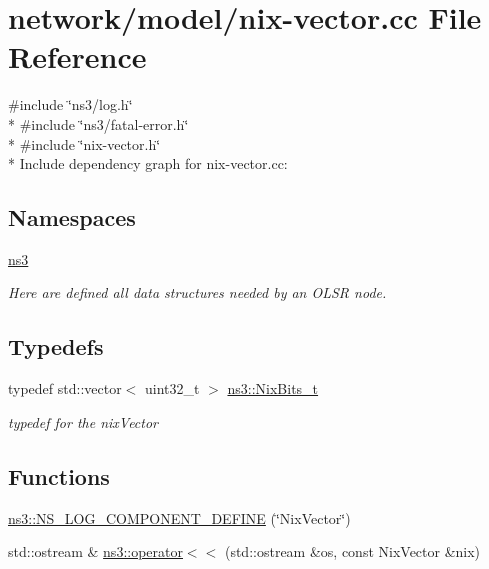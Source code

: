 \hypertarget{nix-vector_8cc}{}\section{network/model/nix-\/vector.cc File Reference}
\label{nix-vector_8cc}
{\ttfamily \#include \char`\"{}ns3/log.\+h\char`\"{}}\\*
{\ttfamily \#include \char`\"{}ns3/fatal-\/error.\+h\char`\"{}}\\*
{\ttfamily \#include \char`\"{}nix-\/vector.\+h\char`\"{}}\\*
Include dependency graph for nix-\/vector.cc\+:
\subsection*{Namespaces}
\begin{DoxyCompactItemize}
\item 
 \hyperlink{namespacens3}{ns3}
\begin{DoxyCompactList}\small\item\em Here are defined all data structures needed by an O\+L\+SR node. \end{DoxyCompactList}\end{DoxyCompactItemize}
\subsection*{Typedefs}
\begin{DoxyCompactItemize}
\item 
typedef std\+::vector$<$ uint32\+\_\+t $>$ \hyperlink{namespacens3_abb639a66feb55bfbc8d8871fcdd78a74}{ns3\+::\+Nix\+Bits\+\_\+t}
\begin{DoxyCompactList}\small\item\em typedef for the nix\+Vector \end{DoxyCompactList}\end{DoxyCompactItemize}
\subsection*{Functions}
\begin{DoxyCompactItemize}
\item 
\hyperlink{namespacens3_a1c1e31fadef417688625337541c78a69}{ns3\+::\+N\+S\+\_\+\+L\+O\+G\+\_\+\+C\+O\+M\+P\+O\+N\+E\+N\+T\+\_\+\+D\+E\+F\+I\+NE} (\char`\"{}Nix\+Vector\char`\"{})
\item 
std\+::ostream \& \hyperlink{namespacens3_a860375f797b8ad7d8283fdb2a19b68c2}{ns3\+::operator$<$$<$} (std\+::ostream \&os, const Nix\+Vector \&nix)
\end{DoxyCompactItemize}
